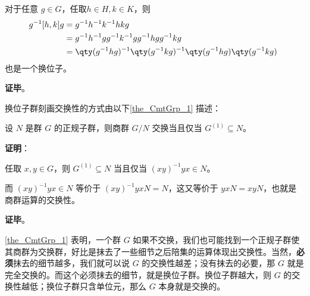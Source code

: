 对于任意 $g\in G$，任取$h\in H, k\in K$，则
\begin{equation}
\begin{aligned}
g^{-1}[h, k]g ={}& g^{-1}h^{-1}k^{-1}hkg\\
={}& g^{-1}h^{-1}gg^{-1}k^{-1}gg^{-1}hgg^{-1}kg\\
={}& \qty(g^{-1}hg)^{-1}\qty(g^{-1}kg)^{-1}\qty(g^{-1}hg)\qty(g^{-1}kg)
\end{aligned}
~
\end{equation}
也是一个换位子。

\textbf{证毕}。




换位子群刻画交换性的方式由以下\autoref{the_CmtGrp_1} 描述：

\begin{theorem}{}\label{the_CmtGrp_1}
设 $N$ 是群 $G$ 的正规子群，则商群 $G/N$ 交换当且仅当 $G^{(1)}\subseteq N$。
\end{theorem}

\textbf{证明}：

任取 $x, y\in G$，则 $G^{(1)}\subseteq N$ 当且仅当 $(xy)^{-1}yx\in N$。

而 $(xy)^{-1}yx\in N$ 等价于 $(xy)^{-1}yxN=N$，这又等价于 $yxN=xyN$，也就是商群运算的交换性。



\textbf{证毕}。

\autoref{the_CmtGrp_1} 表明，一个群 $G$ 如果不交换，我们也可能找到一个正规子群使其商群为交换群，好比是抹去了一些细节之后陪集的运算体现出交换性。当然，\textbf{必须}抹去的细节越多，我们就可以说 $G$ 的交换性越差；没有抹去的必要，那 $G$ 就是完全交换的。而这个必须抹去的细节，就是换位子群。换位子群越大，则 $G$ 的交换性越低；换位子群只含单位元，那么 $G$ 本身就是交换的。












